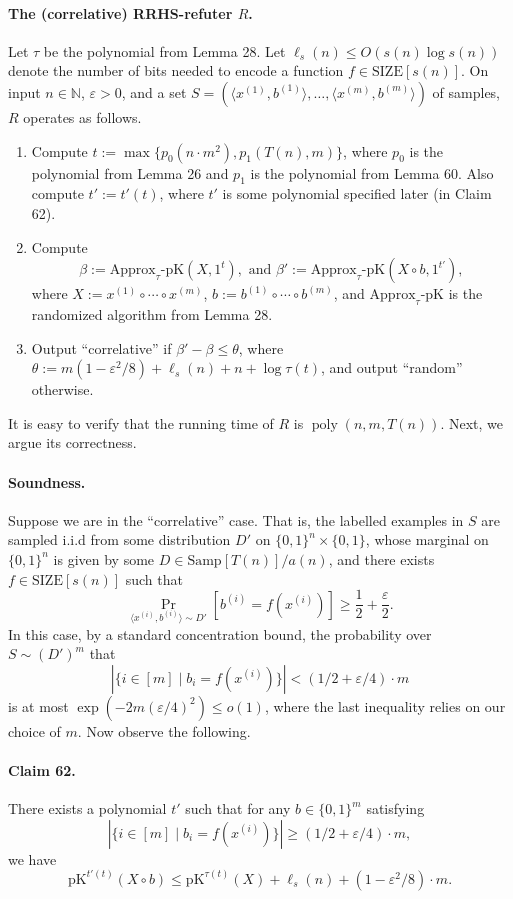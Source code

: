 \documentclass[10pt,a4paper]{article}
\begin{document}
\paragraph{The (correlative) RRHS-refuter $R$.} Let $\tau$ be the polynomial from Lemma 28. Let $\ell_s(n)\leq O(s(n)\log s(n))$ denote the number of bits needed to encode a function $f\in\mathrm{SIZE}[s(n)]$. On input $n\in\mathbb N$, $\varepsilon>0$, and a set $S=(\langle x^{(1)},b^{(1)}\rangle,\ldots,\langle x^{(m)},b^{(m)}\rangle)$ of samples, $R$ operates as follows.
\begin{enumerate}
\item Compute $t:=\max\{p_0(n\cdot m^2),p_1(T(n),m)\}$, where $p_0$ is the polynomial from Lemma 26 and $p_1$ is the polynomial from Lemma 60. Also compute $t':=t'(t)$, where $t'$ is some polynomial specified later (in Claim 62).
\item Compute
\[\beta:=\mathrm{Approx}_\tau\text{-}\mathrm{pK}(X,1^t),\text{ and }\beta':=\mathrm{Approx}_\tau\text{-}\mathrm{pK}(X\circ b,1^{t'}),\]
where $X:=x^{(1)}\circ\cdots\circ x^{(m)}$, $b:=b^{(1)}\circ\cdots\circ b^{(m)}$, and $\mathrm{Approx}_\tau\text{-}\mathrm{pK}$ is the randomized algorithm from Lemma 28.
\item Output ``correlative'' if $\beta'-\beta\leq\theta$, where $\theta:=m(1-\varepsilon^2/8)+\ell_s(n)+n+\log\tau(t)$, and output ``random'' otherwise.
\end{enumerate}
It is easy to verify that the running time of $R$ is $\operatorname{poly}(n,m,T(n))$. Next, we argue its correctness.
\paragraph{Soundness.} Suppose we are in the ``correlative'' case. That is, the labelled examples in $S$ are sampled i.i.d from some distribution $D'$ on $\{0,1\}^n\times\{0,1\}$, whose marginal on $\{0,1\}^n$ is given by some $D\in\mathrm{Samp}[T(n)]/a(n)$, and there exists $f\in\mathrm{SIZE}[s(n)]$ such that
\[\Pr_{\langle x^{(i)},b^{(i)}\rangle\sim D'}[b^{(i)}=f(x^{(i)})]\geq\frac12+\frac\varepsilon2.\]
In this case, by a standard concentration bound, the probability over $S\sim(D')^m$ that
\[|\{i\in[m]\mid b_i=f(x^{(i)})\}|<(1/2+\varepsilon/4)\cdot m\]
is at most $\exp(-2m(\varepsilon/4)^2)\leq o(1)$, where the last inequality relies on our choice of $m$. Now observe the following.
\paragraph{Claim 62.} There exists a polynomial $t'$ such that for any $b\in\{0,1\}^m$ satisfying
\[|\{i\in[m]\mid b_i=f(x^{(i)})\}|\geq(1/2+\varepsilon/4)\cdot m,\]
we have
\[\mathrm{pK}^{t'(t)}(X\circ b)\leq\mathrm{pK}^{\tau(t)}(X)+\ell_s(n)+(1-\varepsilon^2/8)\cdot m.\]
\end{document}
